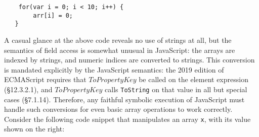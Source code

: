 \documentclass[sigplan,review,anonymous]{acmart}\settopmatter{printfolios=true,printccs=false,printacmref=false}
\begin{document}





\smallskip
\begin{center}
	\begin{minipage}{5cm}
		\begin{verbatim}
    for(var i = 0; i < 10; i++) {
        arr[i] = 0;
   }
		\end{verbatim}
	\end{minipage}
\end{center}
\smallskip


A casual glance at the above code reveals no use of strings at all, but the semantics of field access is somewhat unusual in JavaScript: the arrays are indexed by strings, and numeric indices are converted to strings. This conversion is mandated explicitly by the JavaScript semantics: the 2019 edition of ECMAScript \cite{?} requires that $ToPropertyKey$ be called on the element expression (\S{12.3.2.1}), and $ToPropertyKey$ calls {\tt{ToString}} on that value in all but special cases (\S{7.1.14}). Therefore, any faithful symbolic execution of JavaScript must handle such conversions for even basic array operations to work correctly. Consider the following code snippet that manipulates an array \texttt{x}, with its value shown on the right:
\end{document}
